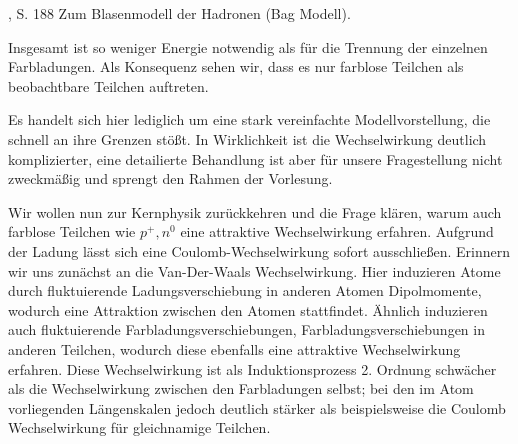 %
	{\KuckukKern, S. 188}%
	{Zum Blasenmodell der Hadronen (Bag Modell).}

Insgesamt ist so weniger Energie notwendig als für die Trennung der einzelnen
Farbladungen. Als Konsequenz sehen wir, dass es nur farblose Teilchen als
beobachtbare Teilchen auftreten.

Es handelt sich hier lediglich um eine stark vereinfachte Modellvorstellung,
die schnell an ihre Grenzen stößt. In Wirklichkeit ist die Wechselwirkung
deutlich komplizierter, eine detailierte Behandlung ist aber für unsere
Fragestellung nicht zweckmäßig und sprengt den Rahmen der Vorlesung.

Wir wollen nun zur Kernphysik zurückkehren und die Frage klären, warum auch
farblose Teilchen wie $p^+, n^0$ eine attraktive Wechselwirkung erfahren.
Aufgrund der Ladung lässt sich eine Coulomb-Wechselwirkung sofort ausschließen.
Erinnern wir uns zunächst an die Van-Der-Waals Wechselwirkung. Hier induzieren
Atome durch fluktuierende Ladungsverschiebung in anderen Atomen Dipolmomente,
wodurch eine Attraktion zwischen den Atomen stattfindet. Ähnlich induzieren
auch fluktuierende Farbladungsverschiebungen, Farbladungsverschiebungen in
anderen Teilchen, wodurch diese ebenfalls eine attraktive Wechselwirkung
erfahren. Diese Wechselwirkung ist als Induktionsprozess 2. Ordnung 
schwächer als die Wechselwirkung zwischen den Farbladungen selbst; bei
den im Atom vorliegenden Längenskalen jedoch deutlich stärker als beispielsweise
die Coulomb Wechselwirkung für gleichnamige Teilchen.

